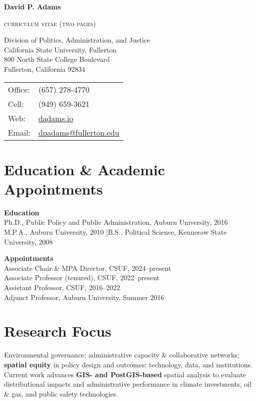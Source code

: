 \documentclass[12pt,letterpaper]{article}
\def\name{David P. Adams}
\begin{document}
\centerline{\huge \bf \name}
\smallskip
\centerline{\small{\textsc{curriculum vitae (two pages)}}}
\bigskip

\begin{minipage}[t]{0.57\textwidth}
Division of Politics, Administration, and Justice \\
California State University, Fullerton \\
800 North State College Boulevard \\
Fullerton, California 92834
\end{minipage}
\hfill
\begin{minipage}[t]{0.4\textwidth}
\begin{tabular}{@{}ll}
Office: & (657) 278-4770 \\
Cell: & (949) 659-3621 \\
Web: & \href{https://dadams.io}{dadams.io} \\
Email: & \href{mailto:dpadams@fullerton.edu}{dpadams@fullerton.edu}
\end{tabular}
\end{minipage}

\vspace{0.6em}

\section*{Education \& Academic Appointments}
\textbf{Education}\\
Ph.D., Public Policy and Public Administration, Auburn University, 2016 \\
M.P.A., Auburn University, 2010 \quad|\quad B.S., Political Science, Kennesaw State University, 2008

\vspace{0.3em}
\textbf{Appointments}\\
Associate Chair \& MPA Director, CSUF, 2024--present \\
Associate Professor (tenured), CSUF, 2022--present \\
Assistant Professor, CSUF, 2016--2022 \\
Adjunct Professor, Auburn University, Summer 2016

\section*{Research Focus}
Environmental governance; administrative capacity \& collaborative networks; \textbf{spatial equity} in policy design and outcomes; technology, data, and institutions. Current work advances \textbf{GIS- and PostGIS-based} spatial analysis to evaluate distributional impacts and administrative performance in climate investments, oil \& gas, and public safety technologies.
\end{document}

